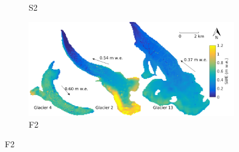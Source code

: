 \documentclass{sfuthesis}
\begin{document}
\begin{figure}[H]
\begin{subfigure}[b]{0.475\textwidth}
            \caption[]%
            {{\small S2}}    
        \end{subfigure}
        \quad
        \begin{subfigure}[b]{0.475\textwidth}   
            \centering 
            \includegraphics[width=\textwidth]{BMSmap_Modelled_Observed_Opt4.png}
            \caption[]%
            {{\small F2}}    
        \end{subfigure}
        

\end{figure}
\end{document}

